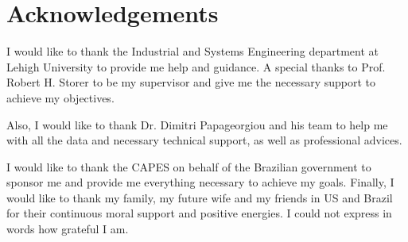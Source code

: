 \chapter*{Acknowledgements}

I would like to thank the Industrial and Systems Engineering department at Lehigh University to provide me help and guidance. A special thanks to Prof. Robert H. Storer to be my supervisor and give me the necessary support to achieve my objectives.

Also, I would like to thank Dr. Dimitri Papageorgiou and his team to help me with all the data and necessary technical support, as well as professional advices.

I would like to thank the CAPES on behalf of the Brazilian government to sponsor me and provide me everything necessary to achieve my goals. Finally, I would like to thank my family, my future wife and my friends in US and Brazil for their continuous moral support and positive energies. I could not express in words how grateful I am.